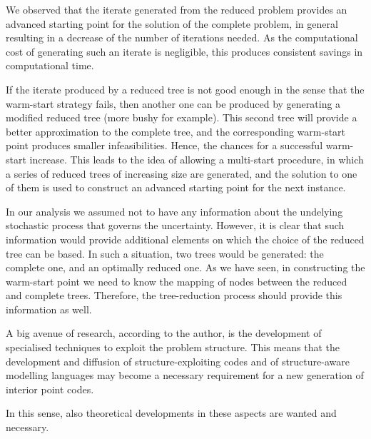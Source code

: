 We observed that the iterate generated from the reduced problem
provides an advanced starting point for the solution of the complete problem,
in general resulting in a decrease of the number of iterations needed.
As the computational cost of generating such an iterate is negligible,
this produces consistent savings in computational time.

If the iterate produced by a reduced tree is not good enough 
in the sense that the warm-start strategy fails, then another one 
can be produced by generating a modified reduced tree (more 
bushy for example).
This second tree will provide a better approximation to the
complete tree, and the corresponding warm-start point produces
smaller infeasibilities. Hence, the chances for a successful 
warm-start increase.
This leads to the idea of allowing a multi-start procedure, in
which a series of reduced trees of increasing size are generated,
and the solution to one of them is used to construct an 
advanced starting point for the next instance.

In our analysis we assumed not to have any information about the
undelying stochastic process that governs the uncertainty.
However, it is clear that such information would provide additional
elements on which the choice of the reduced tree can be based.
In such a situation, two trees would be generated: the complete one,
and an optimally reduced one.
As we have seen, in constructing the warm-start point we need
to know the mapping of nodes between the reduced and complete trees.
Therefore, the tree-reduction process should provide this information
as well.

A big avenue of research, according to the author, is the development
of specialised techniques to exploit the problem structure.
This means that the development and diffusion of structure-exploiting
codes and of structure-aware modelling languages may become a necessary
requirement for a new generation of interior point codes.

In this sense, also theoretical developments in these aspects are 
wanted and necessary.
